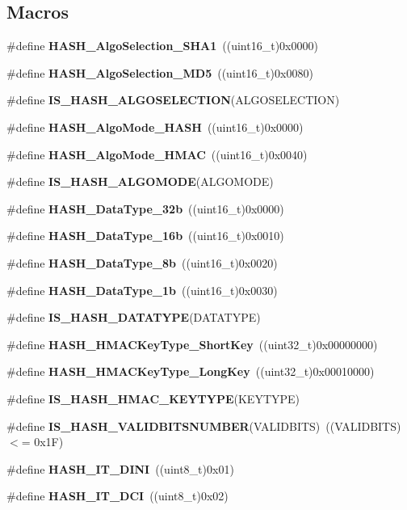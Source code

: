 \subsection*{Macros}
\begin{DoxyCompactItemize}
\item 
\#define \textbf{ H\+A\+S\+H\+\_\+\+Algo\+Selection\+\_\+\+S\+H\+A1}~((uint16\+\_\+t)0x0000)
\item 
\#define \textbf{ H\+A\+S\+H\+\_\+\+Algo\+Selection\+\_\+\+M\+D5}~((uint16\+\_\+t)0x0080)
\item 
\#define \textbf{ I\+S\+\_\+\+H\+A\+S\+H\+\_\+\+A\+L\+G\+O\+S\+E\+L\+E\+C\+T\+I\+ON}(A\+L\+G\+O\+S\+E\+L\+E\+C\+T\+I\+ON)
\item 
\#define \textbf{ H\+A\+S\+H\+\_\+\+Algo\+Mode\+\_\+\+H\+A\+SH}~((uint16\+\_\+t)0x0000)
\item 
\#define \textbf{ H\+A\+S\+H\+\_\+\+Algo\+Mode\+\_\+\+H\+M\+AC}~((uint16\+\_\+t)0x0040)
\item 
\#define \textbf{ I\+S\+\_\+\+H\+A\+S\+H\+\_\+\+A\+L\+G\+O\+M\+O\+DE}(A\+L\+G\+O\+M\+O\+DE)
\item 
\#define \textbf{ H\+A\+S\+H\+\_\+\+Data\+Type\+\_\+32b}~((uint16\+\_\+t)0x0000)
\item 
\#define \textbf{ H\+A\+S\+H\+\_\+\+Data\+Type\+\_\+16b}~((uint16\+\_\+t)0x0010)
\item 
\#define \textbf{ H\+A\+S\+H\+\_\+\+Data\+Type\+\_\+8b}~((uint16\+\_\+t)0x0020)
\item 
\#define \textbf{ H\+A\+S\+H\+\_\+\+Data\+Type\+\_\+1b}~((uint16\+\_\+t)0x0030)
\item 
\#define \textbf{ I\+S\+\_\+\+H\+A\+S\+H\+\_\+\+D\+A\+T\+A\+T\+Y\+PE}(D\+A\+T\+A\+T\+Y\+PE)
\item 
\#define \textbf{ H\+A\+S\+H\+\_\+\+H\+M\+A\+C\+Key\+Type\+\_\+\+Short\+Key}~((uint32\+\_\+t)0x00000000)
\item 
\#define \textbf{ H\+A\+S\+H\+\_\+\+H\+M\+A\+C\+Key\+Type\+\_\+\+Long\+Key}~((uint32\+\_\+t)0x00010000)
\item 
\#define \textbf{ I\+S\+\_\+\+H\+A\+S\+H\+\_\+\+H\+M\+A\+C\+\_\+\+K\+E\+Y\+T\+Y\+PE}(K\+E\+Y\+T\+Y\+PE)
\item 
\#define \textbf{ I\+S\+\_\+\+H\+A\+S\+H\+\_\+\+V\+A\+L\+I\+D\+B\+I\+T\+S\+N\+U\+M\+B\+ER}(V\+A\+L\+I\+D\+B\+I\+TS)~((V\+A\+L\+I\+D\+B\+I\+TS) $<$= 0x1\+F)
\item 
\#define \textbf{ H\+A\+S\+H\+\_\+\+I\+T\+\_\+\+D\+I\+NI}~((uint8\+\_\+t)0x01)
\item 
\#define \textbf{ H\+A\+S\+H\+\_\+\+I\+T\+\_\+\+D\+CI}~((uint8\+\_\+t)0x02)

\end{DoxyCompactItemize}

